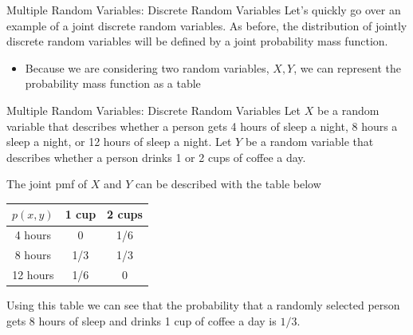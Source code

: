 \documentclass[notheorems,9pt, handout]{beamer}
\begin{document}
\begin{frame}{Multiple Random Variables: Discrete Random Variables} 
	\label{frame:mrv-intro3}
	Let's quickly go over an example of a joint discrete random variables. As before, the distribution of jointly discrete random variables will be defined by a joint probability mass function. 
	\onslide<2->
	\begin{itemize}
		\item Because we are considering two random variables, \(X,Y\), we can represent the probability mass function as a table
	\end{itemize}
\end{frame}
\begin{frame}{Multiple Random Variables: Discrete Random Variables} 
	\label{frame:mrv-intro4}
	Let \(X\) be a random variable that describes whether a person gets 4 hours of sleep a night, 8 hours a sleep a night, or 12 hours of sleep a night. Let \(Y\) be a random variable that describes whether a person drinks 1 or 2 cups of coffee a day. 

	The joint pmf of \(X\) and \(Y\) can be described with the table below
	\begin{table}[htpb]
		\centering
		\begin{tabular}{c|cc}
			\(p(x,y)\) & 1 cup  & 2 cups\\
			\hline
			4 hours & 0 & 1/6 \\
			8 hours & 1/3 & 1/3 \\
			12 hours & 1/6 & 0
		\end{tabular}
	\end{table}
	Using this table we can see that the probability that a randomly selected person gets 8 hours of sleep and drinks 1 cup of coffee a day is \(1/3\).

\end{frame}
\end{document}
